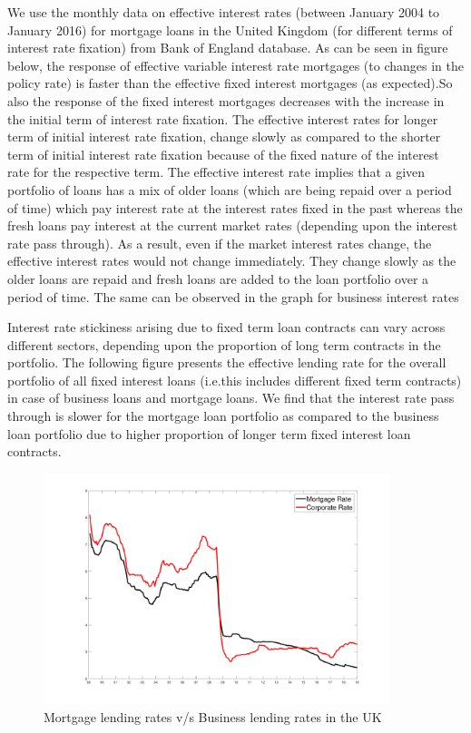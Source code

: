 \documentclass[12pt]{article}
\numberwithin{equation}{section}
\begin{document}
We use the monthly data on effective interest rates (between January 2004 to January 2016)  for mortgage loans in the United Kingdom (for different terms of interest rate fixation) from Bank of England database.
As can be seen in figure below, the response of effective variable interest rate mortgages (to changes in the policy rate) is faster than the effective fixed interest mortgages (as expected).So also the response of the fixed interest mortgages decreases with the increase in the initial term of interest rate fixation.
The effective interest rates for longer term of initial interest rate fixation, change slowly as compared to the shorter term of initial interest rate fixation  because of the fixed nature of the interest rate for the respective term. The effective interest rate implies that a given portfolio of loans has a mix of older loans (which are being repaid over a period of time) which pay interest rate at the interest rates fixed in the past whereas the fresh loans pay interest at the current market rates (depending upon the interest rate pass through). As a result, even if the market interest rates change, the effective interest rates would not change immediately. They change slowly as the older loans are repaid and fresh loans are added to the loan portfolio over a period of time. The same can be observed in the graph for business interest rates

Interest rate stickiness arising due to fixed term loan contracts can vary across different sectors, depending upon the proportion of long term contracts in the portfolio. The following figure presents the effective lending rate for the overall portfolio of all fixed interest loans  (i.e.this includes different fixed term contracts) in case of business loans and mortgage loans. We find that the interest rate pass through is slower for the mortgage loan portfolio as compared to the business loan portfolio due to higher proportion of longer term fixed interest loan contracts.

\begin{figure}[h!] 
	\caption{Mortgage lending rates v/s Business lending rates in the UK} 
	\centering
	
	\includegraphics[width=0.9\textwidth]{int_rate_monthly_plot.pdf}
	
\end{figure}
\end{document}
